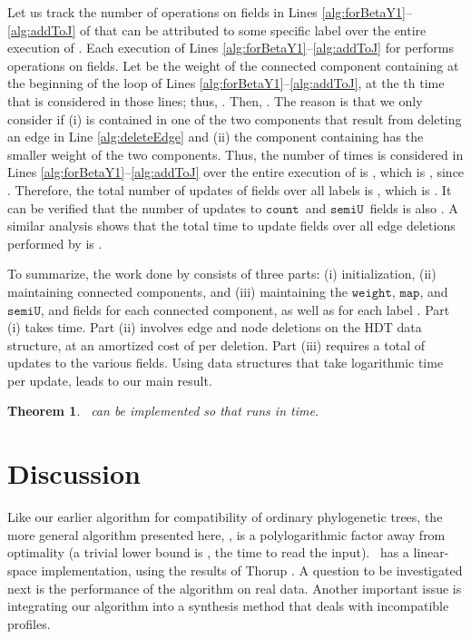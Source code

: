 \documentclass[11pt]{article}
\newcommand{\cnt}{\ensuremath{\mathtt{count}}} \newcommand{\ID}{\ensuremath{\mathtt{id}}} \newcommand{\TYPE}{\ensuremath{\mathtt{in}}} \newcommand{\SIZE}{\ensuremath{\mathtt{size}}} \newcommand{\COUNT}{\ensuremath{\mathtt{count}}} \newcommand{\SET}{\ensuremath{\mathtt{set}}} \newcommand{\SEMI}{\ensuremath{\mathtt{semiU}}} \newcommand{\LABEL}{\ensuremath{\mathtt{label}}} \newcommand{\WEIGHT}{\ensuremath{\mathtt{weight}}} \newcommand{\NULL}{\ensuremath{\mathtt{null}}} \newcommand{\MAP}{\ensuremath{\mathtt{map}}} \newcommand{\KEY}{\ensuremath{\mathtt{key}}} \newcommand{\VALUE}{\ensuremath{\mathtt{value}}} \newcommand{\KEYSET}{\ensuremath{\mathtt{keySet}}}
\newtheorem{theorem}{Theorem}
\theoremstyle{definition}
\begin{document}
Let us track the number of operations on  fields in Lines \ref{alg:forBetaY1}--\ref{alg:addToJ} of  that can be attributed to some specific label  over the entire execution of .  
Each execution of Lines \ref{alg:forBetaY1}--\ref{alg:addToJ} for  performs  operations on  fields.
Let  be the weight of the connected component containing  at the beginning of the loop of Lines \ref{alg:forBetaY1}--\ref{alg:addToJ}, at the th time that  is considered in those lines; thus, .  Then, .  The reason is that we only consider  if (i)  is contained in one of the two components that result from
deleting an edge in Line \ref{alg:deleteEdge} and (ii) the component containing  has the smaller weight of the two components.  Thus, the number of times  is considered in Lines \ref{alg:forBetaY1}--\ref{alg:addToJ}  over the entire execution of  is , which is , since . Therefore, the total number of updates of  fields over all labels is , which is . 
It can be verified that the number of updates to \cnt\ and \SEMI\ fields is also . 
A similar analysis shows that the total time to update  fields over all edge deletions performed by   is . 

To summarize, the work done by  consists of three parts: (i) initialization, (ii) maintaining connected components, and (iii) maintaining the \WEIGHT, \MAP, and \SEMI, and fields for each connected component, as well as  for each label . Part (i) takes  time. Part (ii) involves  edge and node deletions on the HDT data structure, at an amortized cost of  per deletion. Part (iii) requires a total of  updates to the various fields.  Using data structures that take logarithmic time per update, leads to our main result.  


\begin{theorem}\label{thm:SLBuildA}
\SLBuild\ can be implemented so that \SLBuild runs in  time.
\end{theorem}

\section{Discussion\label{sec:discussion}}

Like our earlier algorithm for compatibility of ordinary phylogenetic trees, the more general algorithm presented here, \SLBuild, is a polylogarithmic factor away from optimality (a trivial lower bound is , the time to read the input).  \SLBuild\ has a linear-space implementation, using the results of Thorup \cite{Thorup2000}.  A question to be investigated next is the performance of the algorithm on real data.  Another important issue is integrating our algorithm into a synthesis method that deals with incompatible profiles. 
\end{document}
